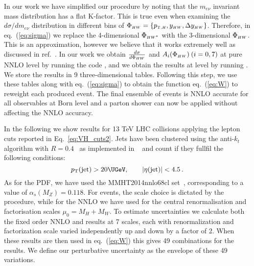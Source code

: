 In our work we have simplified our procedure by noting that the
$m_{e\nu}$ invariant mass distribution has a flat K-factor. This is
true even when examining the $d\sigma/d m_{e\nu}$ distribution in
different bins of $\Phi_{\scriptscriptstyle HW} = \{p_{\scriptscriptstyle \mathrm{T},H},
y_{\scriptscriptstyle HW}, \Delta y_{\scriptscriptstyle HW}
\}$. Therefore, in eq.~(\ref{eq:sigma}) we replace the 4-dimensional
$\Phi_{\scriptscriptstyle HW^*}$ with the 3-dimensional $\Phi_{\scriptscriptstyle HW}$. This is an
approximation, however we believe that it works extremely well as
discussed in ref.~\cite{astill:2016}. In our work we obtain
$\frac{d\sigma}{d\Phi_{\scriptscriptstyle HW}}$ and $A_i(\Phi_{\scriptscriptstyle HW})\:(i=0,7)$ at pure
NNLO level by running the \HVNNLO{} code
\cite{Ferrera:2011bk,Ferrera:2013yga,private}, and we obtain the
results at \MINLO{} level by running \HWJMINLO{}
\cite{Luisoni:2013kna}. We store the results in 9 three-dimensional
tables. Following this step, we use these tables along with
eq.~(\ref{eq:sigma}) to obtain the function eq.~(\ref{eq:W}) to reweight
each produced event. The final ensemble of events is NNLO accurate for
all observables at Born level and a parton shower can now be applied
without affecting the NNLO accuracy.

In the following we show results for 13 TeV LHC collisions applying the
lepton cuts reported in Eq.~\eqref{eq:VH_cuts2}.
Jets have been clustered using the anti-$k_t$
algorithm with $R=0.4$~\cite{Cacciari:2008gp} as implemented in
\FASTJET{}~\cite{Cacciari:2005hq,Cacciari:2011ma} and count if they fullfil
the following conditions:
\begin{equation}
p_{\mathrm{T}}(\mbox{\rm jet}) > 20\UGeV, \qquad
|\eta(\mbox{\rm jet})| < 4.5 \,.
\end{equation}
% 
As for the PDF, we have used the MMHT2014nnlo68cl set~\cite{Harland-Lang:2014zoa},
corresponding to a value of $\alpha_s(M_{\scriptscriptstyle Z}) = 0.118$. 
%
For \HWJMINLO{} events, the scale choice is dictated by the \MINLO{}
procedure, while for the NNLO we have used for the central renormalisation
and factorisation scales $\mu_0 = M_{\scriptscriptstyle H}+M_{\scriptscriptstyle W}$.
To estimate uncertainties we
calculate both the fixed order NNLO and \HWJMINLO{} results at 7
scales, each with renormalization and factorization scale varied
independently up and down by a factor of 2. When these results are
then used in eq.~(\ref{eq:W}) this gives 49 combinations for the
\NNLOPS{} results. We define our perturbative uncertainty as the envelope
of these 49 variations.

